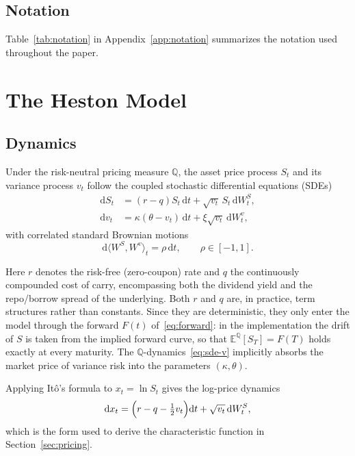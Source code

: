 \documentclass[11pt,a4paper]{article}
\theoremstyle{plain}
\theoremstyle{definition}
\newcommand{\dd}{\mathrm{d}}
\newcommand{\E}{\mathbb{E}}
\newcommand{\Q}{\mathbb{Q}}
\begin{document}
\subsection{Notation}
Table~\ref{tab:notation} in Appendix~\ref{app:notation} summarizes the notation used throughout the paper.







\clearpage
\section{The Heston Model}
\label{sec:heston}

\subsection{Dynamics}
Under the risk-neutral pricing measure $\Q$, the asset price process $S_t$ and its variance process $v_t$ follow the coupled stochastic differential equations (SDEs)
\begin{align}
    \dd S_t &= (r - q) S_t \,\dd t + \sqrt{v_t}\, S_t \,\dd W_t^S, \label{eq:sde-S}\\
    \dd v_t &= \kappa (\theta - v_t)\,\dd t + \xi \sqrt{v_t}\,\dd W_t^v, \label{eq:sde-v}
\end{align}
with correlated standard Brownian motions
\begin{equation}
    \dd\langle W^S, W^v \rangle_t = \rho\,\dd t, \qquad \rho \in [-1, 1].
    \label{eq:corr}
\end{equation}

Here $r$ denotes the risk-free (zero-coupon) rate and $q$ the continuously compounded cost of carry, encompassing both the dividend yield and the repo/borrow spread of the underlying. Both $r$ and $q$ are, in practice, term structures rather than constants. Since they are deterministic, they only enter the model through the forward $F(t)$ of~\eqref{eq:forward}: in the implementation the drift of $S$ is taken from the implied forward curve, so that $\E^\Q[S_T]=F(T)$ holds exactly at every maturity. The $\Q$-dynamics~\eqref{eq:sde-v} implicitly absorbs the market price of variance risk into the parameters $(\kappa,\theta)$.

Applying It\^o's formula to $x_t=\ln S_t$ gives the log-price dynamics
\begin{equation}
    \dd x_t = \Bigl(r - q - \tfrac12 v_t\Bigr)\dd t + \sqrt{v_t}\,\dd W_t^S,
    \label{eq:sde-x}
\end{equation}
which is the form used to derive the characteristic function in Section~\ref{sec:pricing}.
\end{document}
